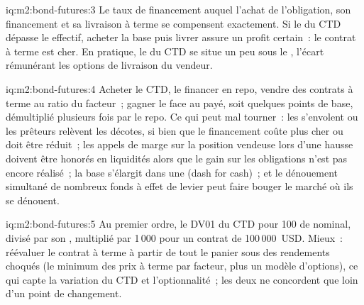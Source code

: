 \begin{solution}{iq:m2:bond-futures:3}
Le taux de financement auquel l'achat de l'obligation, son financement et sa livraison
à terme se compensent exactement. Si le  du CTD dépasse le 
effectif, acheter la base puis livrer assure un profit certain~: le contrat à terme est cher.
En pratique, le  du CTD se situe un peu sous le , l'écart
rémunérant les options de livraison du vendeur.
\end{solution}

\begin{solution}{iq:m2:bond-futures:4}
Acheter le CTD, le financer en repo, vendre des contrats à terme au ratio du facteur~;
gagner le  face au  payé, soit quelques points de base,
démultiplié plusieurs fois par le repo. Ce qui peut mal tourner~: les  s'envolent ou les prêteurs relèvent les décotes,
si bien que le financement coûte plus cher ou doit être réduit~; les appels de marge sur la position vendeuse lors d'une hausse
doivent être honorés en liquidités alors que le gain sur les obligations n'est pas encore réalisé~; la base s'élargit dans une  (dash for cash)~; et le dénouement simultané de nombreux fonds à effet de levier peut faire bouger
le marché où ils se dénouent.
\end{solution}

\begin{solution}{iq:m2:bond-futures:5}
Au premier ordre, le DV01 du CTD pour 100 de nominal, divisé par son ,
multiplié par 1\,000 pour un contrat de 100\,000~USD. Mieux~: réévaluer le contrat à terme à partir
de tout le panier sous des rendements choqués (le minimum des prix à terme par facteur, plus un
modèle d'options), ce qui capte la variation du CTD et l'optionnalité~; les deux ne concordent
que loin d'un point de changement.
\end{solution}

